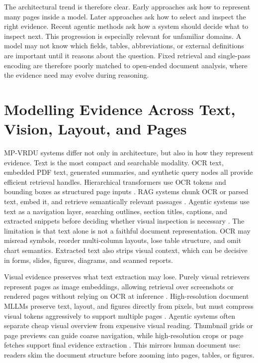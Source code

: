\documentclass[10pt,a4paper]{article}
\begin{document}
The architectural trend is therefore clear. Early approaches ask how to represent many pages inside a model. Later approaches ask how to select and inspect the right evidence. Recent agentic methods ask how a system should decide what to inspect next. This progression is especially relevant for unfamiliar domains. A model may not know which fields, tables, abbreviations, or external definitions are important until it reasons about the question. Fixed retrieval and single-pass encoding are therefore poorly matched to open-ended document analysis, where the evidence need may evolve during reasoning.

\section{Modelling Evidence Across Text, Vision, Layout, and Pages}

MP-VRDU systems differ not only in architecture, but also in how they represent evidence. Text is the most compact and searchable modality. OCR text, embedded PDF text, generated summaries, and synthetic query nodes all provide efficient retrieval handles. Hierarchical transformers use OCR tokens and bounding boxes as structured page inputs \cite{tito2023hierarchical,borchmann2025arctic}. RAG systems chunk OCR or parsed text, embed it, and retrieve semantically relevant passages \cite{lopez2025enhancing,shin2025multidocfusion}. Agentic systems use text as a navigation layer, searching outlines, section titles, captions, and extracted snippets before deciding whether visual inspection is necessary \cite{sun2025docagent,zhu2025doclens}. The limitation is that text alone is not a faithful document representation. OCR may misread symbols, reorder multi-column layouts, lose table structure, and omit chart semantics. Extracted text also strips visual context, which can be decisive in forms, slides, figures, diagrams, and scanned reports.

Visual evidence preserves what text extraction may lose. Purely visual retrievers represent pages as image embeddings, allowing retrieval over screenshots or rendered pages without relying on OCR at inference \cite{cho2024m3docrag,tanaka2025vdocrag}. High-resolution document MLLMs preserve text, layout, and figures directly from pixels, but must compress visual tokens aggressively to support multiple pages \cite{hu2025mplug,hannan2025docslm}. Agentic systems often separate cheap visual overview from expensive visual reading. Thumbnail grids or page previews can guide coarse navigation, while high-resolution crops or page fetches support final evidence extraction \cite{zheng2026doc,wang2025vidorag}. This mirrors human document use: readers skim the document structure before zooming into pages, tables, or figures.
\end{document}
